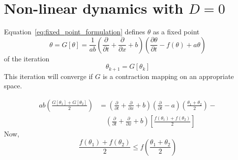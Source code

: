 \documentclass[12pt]{amsart}
\begin{document}
\section{Non-linear dynamics with $D=0$}

Equation~\ref{eq:fixed_point_formulation} defines $\theta$ as a fixed point
\begin{equation}
\theta = G\left[\theta\right] = \frac{1}{ab}  \left(\frac{\partial}{\partial t} + \frac{\partial}{\partial x} +
  b\right)\left( \frac{\partial\theta}{\partial t} - f(\theta) +
  a\theta\right)
  \label{eq:fixed_point_functional}
\end{equation}
of the iteration
\begin{equation}
  \theta_{k+1} = G\left[\theta_{k}\right]
  \label{eq:fixed_point_iteration}
\end{equation}
This iteration will converge if $G$ is a contraction mapping on an appropriate space.

\begin{equation}
\begin{split}
  ab\left(\frac{G\left[\theta_1\right]+G\left[\theta_2\right]}{2}\right) & = 
  \left(\frac{\partial}{\partial t} + \frac{\partial}{\partial x} +  b\right)
  \left(\frac{\partial}{\partial t} - a\right) \left(\frac{\theta_1+\theta_2}{2}\right) - \\
  & \quad \left(\frac{\partial}{\partial t} + \frac{\partial}{\partial x} +  b\right)\left[\frac{f(\theta_1)+f(\theta_2)}{2}\right] 
\end{split}
\end{equation}
Now,
\begin{equation}
\frac{f(\theta_1)+f(\theta_2)}{2} \le f\left(\frac{\theta_1+\theta_2}{2}\right)
\end{equation}



\end{document}
